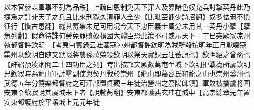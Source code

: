 以本官參謀軍事不列為品秩】上疏曰恩制免天下罪人及募諸色奴充兵討撃契丹此乃捷急之計非天子之兵且比來刑獄久清罪人全少【比毗至翻少詩沼翻】奴多怯弱不慣征行【慣古患翻】縱其募集未足可用况今天下忠臣義士萬分未用其一契丹小孽【孽魚列翻】假命待誅何勞免罪贖奴損國大體臣恐此策不可威示天下　丁巳突厥寇凉州執都督許欽明　【考異曰實録云吐蕃寇凉州都督許欽明為賊所殺按明年正月默啜寇霛州以欽明自随又默啜將襲孫萬榮殺欽明以祭天實録云吐蕃誤也】欽明紹之曾孫也【許紹預凌烟閣二十四功臣之列】時出按部突厥數萬奄至城下欽明拒戰為所虜欽明兄欽寂時為龍山軍討擊副使與契丹戰於崇州【龍山即慕容氏和龍之山也崇州奚州也武德五年分饒樂都督府之可汗部置貞觀三年徙治營州之廢陽師鎮】軍敗被擒虜將圍安東令欽寂說其屬城未下者【說輸芮翻】安東都護裴玄珪在城中【高宗總章元年置安東都護府於平壤城上元元年徙